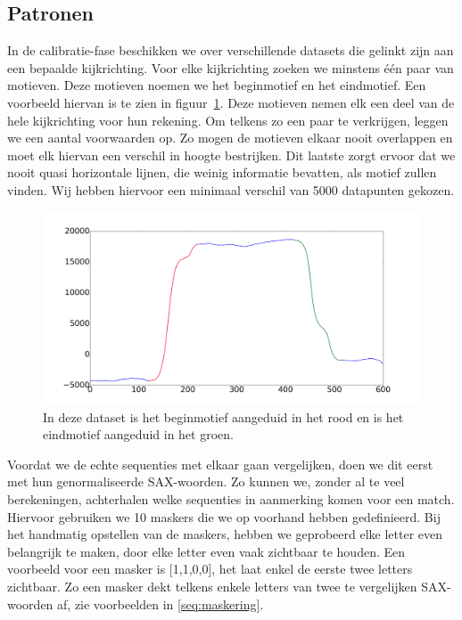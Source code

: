 \documentclass{article}
\begin{document}
\subsection{Patronen}

In de calibratie-fase beschikken we over verschillende datasets die gelinkt zijn aan een bepaalde kijkrichting. Voor elke kijkrichting zoeken we minstens één paar van motieven. Deze motieven noemen we het beginmotief en het eindmotief. Een voorbeeld hiervan is te zien in figuur~\ref{fig:beginend}. Deze motieven nemen elk een deel van de hele kijkrichting voor hun rekening. Om telkens zo een paar te verkrijgen, leggen we een aantal voorwaarden op. Zo mogen de motieven elkaar nooit overlappen en moet elk hiervan een verschil in hoogte bestrijken. Dit laatste zorgt ervoor dat we nooit quasi horizontale lijnen, die weinig informatie bevatten, als motief zullen vinden. Wij hebben hiervoor een minimaal verschil van 5000 datapunten gekozen.

\begin{figure}[h]
\centering
\includegraphics[width=\linewidth]{images/motif_begin_end}
\caption{In deze dataset is het beginmotief aangeduid in het rood en is het eindmotief aangeduid in het groen.}
\label{fig:beginend}
\end{figure}

Voordat we de echte sequenties met elkaar gaan vergelijken, doen we dit eerst met hun genormaliseerde SAX-woorden. Zo kunnen we, zonder al te veel berekeningen, achterhalen welke sequenties in aanmerking komen voor een match. Hiervoor gebruiken we 10 maskers die we op voorhand hebben gedefinieerd. Bij het handmatig opstellen van de maskers, hebben we geprobeerd elke letter even belangrijk te maken, door elke letter even vaak zichtbaar te houden. Een voorbeeld voor een masker is [1,1,0,0], het laat enkel de eerste twee letters zichtbaar.  Zo een masker dekt telkens enkele letters van twee te vergelijken SAX-woorden af, zie voorbeelden in \ref{seq:maskering}. 
\end{document}
